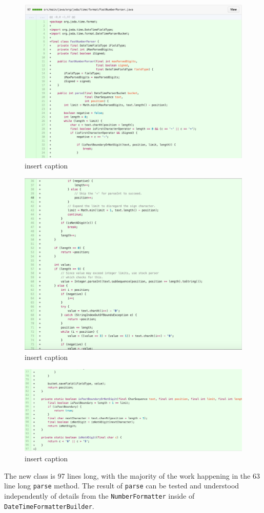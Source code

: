 \begin{figure}[H]
	\centering
	\includegraphics[width=\linewidth]{code9}
	\caption{insert caption}
\end{figure}
\begin{figure}[H]
	\centering
	\includegraphics[width=\linewidth]{code10}
	\caption{insert caption}
\end{figure}
\begin{figure}[H]
	\centering
	\includegraphics[width=\linewidth]{code11}
	\caption{insert caption}
\end{figure}
The new class is 97 lines long, with the majority of the work happening in the 63 line long \texttt{parse} method. The result of \texttt{parse} can be tested and understood independently of details from the \texttt{NumberFormatter} inside of \texttt{DateTimeFormatterBuilder}.

